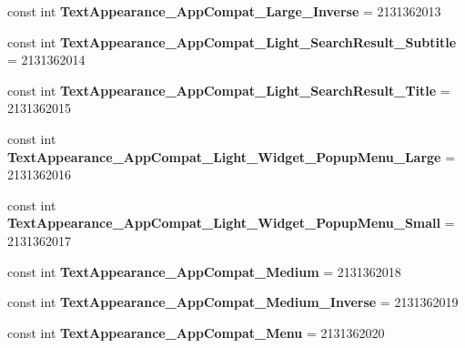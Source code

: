\begin{DoxyCompactItemize}
const int {\bfseries Text\+Appearance\+\_\+\+App\+Compat\+\_\+\+Large\+\_\+\+Inverse} = 2131362013
\item 
\mbox{\label{class_pinned_app_1_1_droid_1_1_resource_1_1_style_ab63ad9eba4a80dca1b7ea305ccf61c5a}} 
const int {\bfseries Text\+Appearance\+\_\+\+App\+Compat\+\_\+\+Light\+\_\+\+Search\+Result\+\_\+\+Subtitle} = 2131362014
\item 
\mbox{\label{class_pinned_app_1_1_droid_1_1_resource_1_1_style_a1b9ecc11bbfb627520fdc4ad1c851fc6}} 
const int {\bfseries Text\+Appearance\+\_\+\+App\+Compat\+\_\+\+Light\+\_\+\+Search\+Result\+\_\+\+Title} = 2131362015
\item 
\mbox{\label{class_pinned_app_1_1_droid_1_1_resource_1_1_style_a6ec8d3896a965c58336e879d9bdfd00d}} 
const int {\bfseries Text\+Appearance\+\_\+\+App\+Compat\+\_\+\+Light\+\_\+\+Widget\+\_\+\+Popup\+Menu\+\_\+\+Large} = 2131362016
\item 
\mbox{\label{class_pinned_app_1_1_droid_1_1_resource_1_1_style_ae445c6c76909c8373b596b5b44ef0389}} 
const int {\bfseries Text\+Appearance\+\_\+\+App\+Compat\+\_\+\+Light\+\_\+\+Widget\+\_\+\+Popup\+Menu\+\_\+\+Small} = 2131362017
\item 
\mbox{\label{class_pinned_app_1_1_droid_1_1_resource_1_1_style_a0be6419f02b8552099c8a7f36eb8e772}} 
const int {\bfseries Text\+Appearance\+\_\+\+App\+Compat\+\_\+\+Medium} = 2131362018
\item 
\mbox{\label{class_pinned_app_1_1_droid_1_1_resource_1_1_style_ad02516bd0feddc42a80f7e8627451f5d}} 
const int {\bfseries Text\+Appearance\+\_\+\+App\+Compat\+\_\+\+Medium\+\_\+\+Inverse} = 2131362019
\item 
\mbox{\label{class_pinned_app_1_1_droid_1_1_resource_1_1_style_a958e12fd1a671c81f3d8ca6591cfb5da}} 
const int {\bfseries Text\+Appearance\+\_\+\+App\+Compat\+\_\+\+Menu} = 2131362020
\item 

\end{DoxyCompactItemize}
